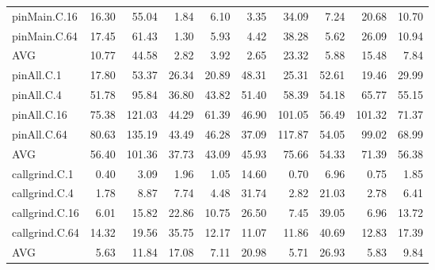 \begin{table*}[]
\begin{center}
\begin{tabular}{lrrrrrrrrr}
 pinMain.C.16   & 16.30 &  55.04 &  1.84 &  6.10 &  3.35 &  34.09 &  7.24 &  20.68 & 10.70 \\
 pinMain.C.64   & 17.45 &  61.43 &  1.30 &  5.93 &  4.42 &  38.28 &  5.62 &  26.09 & 10.94 \\
 AVG            & 10.77 &  44.58 &  2.82 &  3.92 &  2.65 &  23.32 &  5.88 &  15.48 &  7.84 \\
 pinAll.C.1     & 17.80 &  53.37 & 26.34 & 20.89 & 48.31 &  25.31 & 52.61 &  19.46 & 29.99 \\
 pinAll.C.4     & 51.78 &  95.84 & 36.80 & 43.82 & 51.40 &  58.39 & 54.18 &  65.77 & 55.15 \\
 pinAll.C.16    & 75.38 & 121.03 & 44.29 & 61.39 & 46.90 & 101.05 & 56.49 & 101.32 & 71.37 \\
 pinAll.C.64    & 80.63 & 135.19 & 43.49 & 46.28 & 37.09 & 117.87 & 54.05 &  99.02 & 68.99 \\
 AVG            & 56.40 & 101.36 & 37.73 & 43.09 & 45.93 &  75.66 & 54.33 &  71.39 & 56.38 \\
 callgrind.C.1  &  0.40 &   3.09 &  1.96 &  1.05 & 14.60 &   0.70 &  6.96 &   0.75 &  1.85 \\
 callgrind.C.4  &  1.78 &   8.87 &  7.74 &  4.48 & 31.74 &   2.82 & 21.03 &   2.78 &  6.41 \\
 callgrind.C.16 &  6.01 &  15.82 & 22.86 & 10.75 & 26.50 &   7.45 & 39.05 &   6.96 & 13.72 \\
 callgrind.C.64 & 14.32 &  19.56 & 35.75 & 12.17 & 11.07 &  11.86 & 40.69 &  12.83 & 17.39 \\
 AVG            &  5.63 &  11.84 & 17.08 &  7.11 & 20.98 &   5.71 & 26.93 &   5.83 &  9.84 \\
\hline
\end{tabular}
\end{center}
\end{table*}

\fi


\iftrue

